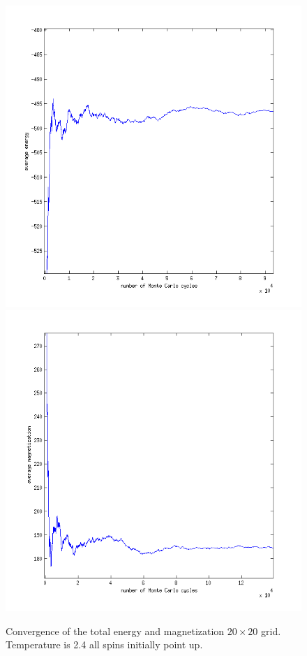\documentclass[a4paper,english, 10pt, twoside]{article}
\begin{document}
\begin{figure}[H]
 \includegraphics[scale=0.5]{energy_ordered_temp2dot4_zoom.png}
 \includegraphics[scale=0.5]{magnetization_ordered_temp2dot4_zoom}
 \caption{Convergence of the total energy and magnetization $20 \times 20$ grid. Temperature is 2.4 all spins initially point up.}
\label{both_ordered_temp2.4}
 \end{figure} 
\end{document}
